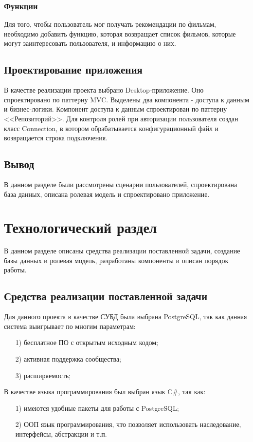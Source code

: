 \subsubsection{Функции}
Для того, чтобы пользователь мог получать рекомендации по фильмам, необходимо добавить функцию, которая возвращает список фильмов, которые могут заинтересовать пользователя, и информацию о них.

\subsection{Проектирование приложения}
В качестве реализации проекта выбрано Desktop-приложение. Оно спроектировано по паттерну MVC. Выделены два компонента - доступа к данным и бизнес-логики. Компонент доступа к данным спроектирован по паттерну <<Репозиторий>>. Для контроля ролей при авторизации пользователя создан класс Connection, в котором обрабатывается конфигурационный файл и возвращается строка подключения. 
\subsection{Вывод}
В данном разделе были рассмотрены сценарии пользователей, спроектирована база данных, описана ролевая модель и спроектировано приложение.

\newpage
\section{Технологический раздел}
В данном разделе описаны средства реализации поставленной задачи, создание базы данных и ролевая модель, разработаны компоненты и описан порядок работы.

\subsection{Средства реализации поставленной задачи}
Для данного проекта в качестве СУБД была выбрана PostgreSQL\cite{psql}, так как данная система выигрывает по многим параметрам:
\begin{itemize}
	\item[1)] бесплатное ПО с открытым исходным кодом;
	\item[2)] активная поддержка сообщества;
	\item[3)] расширяемость;   
\end{itemize}

В качестве языка программирования был выбран язык C\#\cite{sharp}, так как:
\begin{itemize}
	\item[1)] имеются удобные пакеты для работы с PostgreSQL;
	\item[2)] ООП язык программирования, что позволяет использовать наследование, интерфейсы, абстракции и т.п.
\end{itemize}

